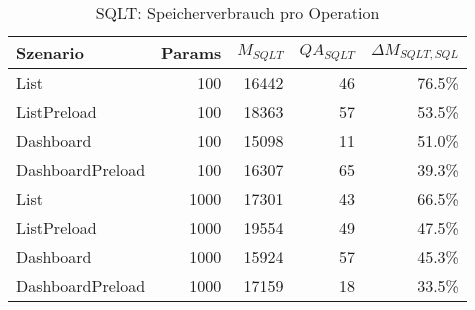 
\begin{table}[ht]
\centering
\caption{SQLT: Speicherverbrauch pro Operation}
\begin{tabular}{lrrrr}
\toprule
Szenario & Params & ${M_{SQLT}}$ & ${QA_{SQLT}}$ & ${\Delta M_{SQLT,SQL}}$ \\
\midrule

	List & 100 & 16442 & 46 & 76.5\% \\
	ListPreload & 100 & 18363 & 57 & 53.5\% \\
	Dashboard & 100 & 15098 & 11 & 51.0\% \\
	DashboardPreload & 100 & 16307 & 65 & 39.3\% \\
	List & 1000 & 17301 & 43 & 66.5\% \\
	ListPreload & 1000 & 19554 & 49 & 47.5\% \\
	Dashboard & 1000 & 15924 & 57 & 45.3\% \\
	DashboardPreload & 1000 & 17159 & 18 & 33.5\% \\
\bottomrule
\end{tabular}
\label{tab:benchmark_sqlt_bytesperop}
\end{table}
	